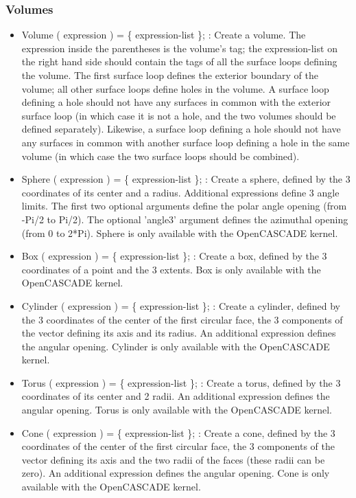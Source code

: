 \documentclass[dvipdfmx, 9pt, a4paper]{article}
\numberwithin{equation}{section}
\begin{document}
\subsubsection{Volumes}
\begin{itemize}
\item Volume ( expression ) = \{ expression-list \}; : Create a volume. The expression inside the parentheses is the volume's tag; the expression-list on the right hand side should contain the tags of all the surface loops defining the volume. The first surface loop defines the exterior boundary of the volume; all other surface loops define holes in the volume. A surface loop defining a hole should not have any surfaces in common with the exterior surface loop (in which case it is not a hole, and the two volumes should be defined separately). Likewise, a surface loop defining a hole should not have any surfaces in common with another surface loop defining a hole in the same volume (in which case the two surface loops should be combined).
\item Sphere ( expression ) = \{ expression-list \}; : Create a sphere, defined by the 3 coordinates of its center and a radius. Additional
expressions define 3 angle limits. The first two optional arguments define the polar angle opening (from -Pi/2 to Pi/2). The optional 'angle3' argument defines the azimuthal opening (from 0 to 2*Pi). Sphere is only available with the OpenCASCADE kernel.
\item Box ( expression ) = \{ expression-list \}; : Create a box, defined by the 3 coordinates of a point and the 3 extents. Box is only available with the OpenCASCADE kernel.
\item Cylinder ( expression ) = \{ expression-list \}; : Create a cylinder, defined by the 3 coordinates of the center of the first circular face, the 3 components of the vector defining its axis and its radius. An additional expression defines the angular opening. Cylinder is only available with the OpenCASCADE kernel.
\item Torus ( expression ) = \{ expression-list \}; : Create a torus, defined by the 3 coordinates of its center and 2 radii. An additional expression defines the angular opening. Torus is only available with the OpenCASCADE kernel.
\item Cone ( expression ) = \{ expression-list \}; : Create a cone, defined by the 3 coordinates of the center of the first circular face, the 3 components of the vector defining its axis and the two radii of the faces (these radii can be zero). An additional expression defines the angular opening. Cone is only available with the OpenCASCADE kernel.

\end{itemize}
\end{document}
